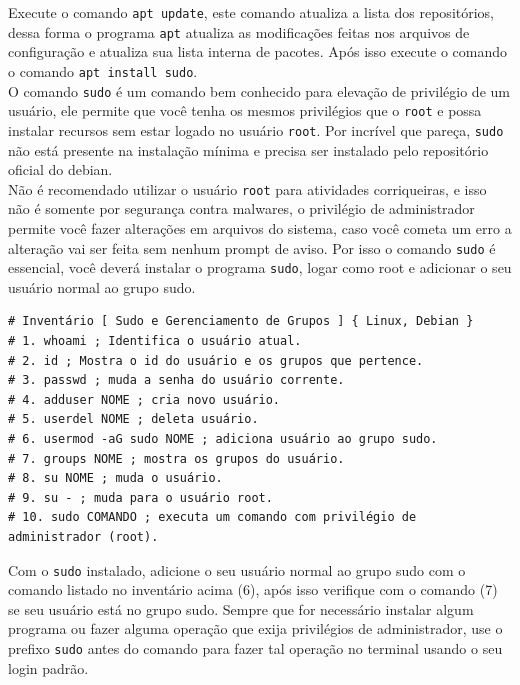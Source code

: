 \documentclass[12pt,a4paper]{article}
\begin{document}
Execute o comando \texttt{apt update}, este comando atualiza a lista dos repositórios, dessa forma o programa \texttt{apt} atualiza as modificações feitas nos arquivos de configuração e atualiza sua lista interna de pacotes. Após isso execute o comando o comando \texttt{apt install sudo}. \\

O comando \texttt{sudo} é um comando bem conhecido para elevação de privilégio de um usuário, ele permite que você tenha os mesmos privilégios que o \texttt{root} e possa instalar recursos sem estar logado no usuário \texttt{root}. Por incrível que pareça, \texttt{sudo} não está presente na instalação mínima e precisa ser instalado pelo repositório oficial do debian. \\

Não é recomendado utilizar o usuário \texttt{root} para atividades corriqueiras, e isso não é somente por segurança contra malwares, o privilégio de administrador permite você fazer alterações em arquivos do sistema, caso você cometa um erro a alteração vai ser feita sem nenhum prompt de aviso. Por isso o comando \texttt{sudo} é essencial, você deverá instalar o programa \texttt{sudo}, logar como root e adicionar o seu usuário normal ao grupo sudo. \\

\begin{lstlisting}
# Inventário [ Sudo e Gerenciamento de Grupos ] { Linux, Debian }
# 1. whoami ; Identifica o usuário atual.
# 2. id ; Mostra o id do usuário e os grupos que pertence.
# 3. passwd ; muda a senha do usuário corrente.
# 4. adduser NOME ; cria novo usuário.
# 5. userdel NOME ; deleta usuário. 
# 6. usermod -aG sudo NOME ; adiciona usuário ao grupo sudo.
# 7. groups NOME ; mostra os grupos do usuário.
# 8. su NOME ; muda o usuário.
# 9. su - ; muda para o usuário root.
# 10. sudo COMANDO ; executa um comando com privilégio de administrador (root).
\end{lstlisting}

\vspace{\baselineskip}

Com o \texttt{sudo} instalado, adicione o seu usuário normal ao grupo sudo com o comando listado no inventário acima (6), após isso verifique com o comando (7) se seu usuário está no grupo sudo. Sempre que for necessário instalar algum programa ou fazer alguma operação que exija privilégios de administrador, use o prefixo \texttt{sudo} antes do comando para fazer tal operação no terminal usando o seu login padrão. \\
\end{document}
